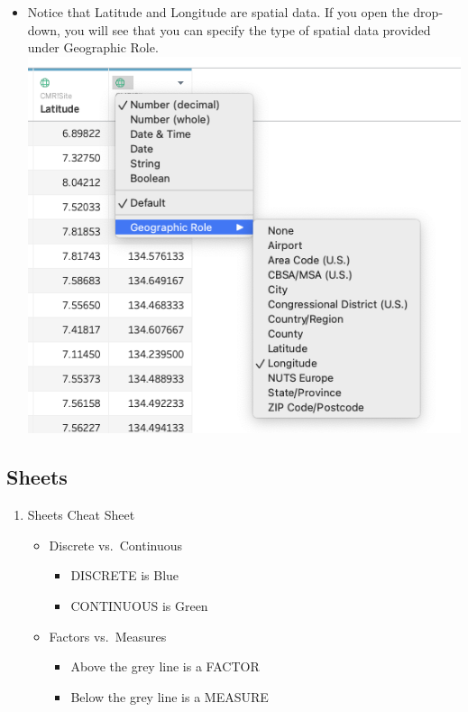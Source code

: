 \documentclass[
]{book}
\providecommand{\tightlist}{%
  \setlength{\itemsep}{0pt}\setlength{\parskip}{0pt}}
\begin{document}
\begin{enumerate}
  \begin{itemize}
  \tightlist
  \item
    Notice that Latitude and Longitude are spatial data. If you open the drop-down, you will see that you can specify the type of spatial data provided under Geographic Role.\\
    \includegraphics{images/m3s1_image5_Data_Types_choosing-coordinates.png}
  \end{itemize}
\end{enumerate}

\hypertarget{sheets}{%
\subsection{Sheets}\label{sheets}}

\begin{enumerate}
\def\labelenumi{\arabic{enumi}.}
\tightlist
\item
  Sheets Cheat Sheet

  \begin{itemize}
  \tightlist
  \item
    Discrete vs.~Continuous

    \begin{itemize}
    \tightlist
    \item
      {DISCRETE is Blue}
    \item
      {CONTINUOUS is Green}
    \end{itemize}
  \item
    Factors vs.~Measures

    \begin{itemize}
    \tightlist
    \item
      Above the grey line is a FACTOR
    \item
      Below the grey line is a MEASURE
    \end{itemize}
  \end{itemize}
\end{enumerate}
\end{document}
